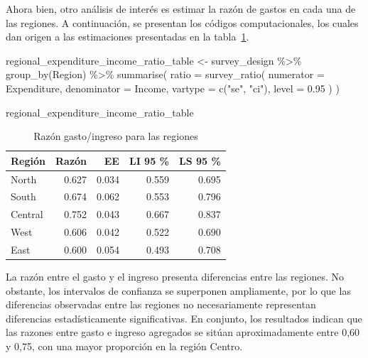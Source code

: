 \documentclass[
  spanish,
  11pt,
  letterpaper,
  oneside,
  open=any]{scrbook}
\newenvironment{Shaded}{\begin{snugshade}}{\end{snugshade}}
\newcommand{\AttributeTok}[1]{\textcolor[rgb]{0.40,0.45,0.13}{#1}}
\newcommand{\FloatTok}[1]{\textcolor[rgb]{0.68,0.00,0.00}{#1}}
\newcommand{\FunctionTok}[1]{\textcolor[rgb]{0.28,0.35,0.67}{#1}}
\newcommand{\NormalTok}[1]{\textcolor[rgb]{0.00,0.23,0.31}{#1}}
\newcommand{\OtherTok}[1]{\textcolor[rgb]{0.00,0.23,0.31}{#1}}
\newcommand{\SpecialCharTok}[1]{\textcolor[rgb]{0.37,0.37,0.37}{#1}}
\newcommand{\StringTok}[1]{\textcolor[rgb]{0.13,0.47,0.30}{#1}}
\begin{document}
Ahora bien, otro análisis de interés es estimar la razón de gastos en
cada una de las regiones. A continuación, se presentan los códigos
computacionales, los cuales dan origen a las estimaciones presentadas en
la tabla~\ref{tbl-razon-gasto-ingreso-reg}.

\begin{Shaded}
\begin{Highlighting}[]
\NormalTok{regional\_expenditure\_income\_ratio\_table }\OtherTok{\textless{}{-}}\NormalTok{ survey\_design }\SpecialCharTok{\%\textgreater{}\%}
  \FunctionTok{group\_by}\NormalTok{(Region) }\SpecialCharTok{\%\textgreater{}\%}
  \FunctionTok{summarise}\NormalTok{(}
    \AttributeTok{ratio =} \FunctionTok{survey\_ratio}\NormalTok{(}
      \AttributeTok{numerator =}\NormalTok{ Expenditure,}
      \AttributeTok{denominator =}\NormalTok{ Income,}
      \AttributeTok{vartype =} \FunctionTok{c}\NormalTok{(}\StringTok{"se"}\NormalTok{, }\StringTok{"ci"}\NormalTok{),}
      \AttributeTok{level =} \FloatTok{0.95}
\NormalTok{    )}
\NormalTok{  )}

\NormalTok{regional\_expenditure\_income\_ratio\_table}
\end{Highlighting}
\end{Shaded}

{

\begin{longtable}[]{@{}lrrrr@{}}

\caption{\label{tbl-razon-gasto-ingreso-reg}Razón gasto/ingreso para las
regiones}

\tabularnewline

\toprule\noalign{}
Región & Razón & EE & LI 95 \% & LS 95 \% \\
\midrule\noalign{}
\endhead
\bottomrule\noalign{}
\endlastfoot
North & 0.627 & 0.034 & 0.559 & 0.695 \\
South & 0.674 & 0.062 & 0.553 & 0.796 \\
Central & 0.752 & 0.043 & 0.667 & 0.837 \\
West & 0.606 & 0.042 & 0.522 & 0.690 \\
East & 0.600 & 0.054 & 0.493 & 0.708 \\

\end{longtable}

}

La razón entre el gasto y el ingreso presenta diferencias entre las
regiones. No obstante, los intervalos de confianza se superponen
ampliamente, por lo que las diferencias observadas entre las regiones no
necesariamente representan diferencias estadísticamente significativas.
En conjunto, los resultados indican que las razones entre gasto e
ingreso agregados se sitúan aproximadamente entre 0,60 y 0,75, con una
mayor proporción en la región Centro.
\end{document}
